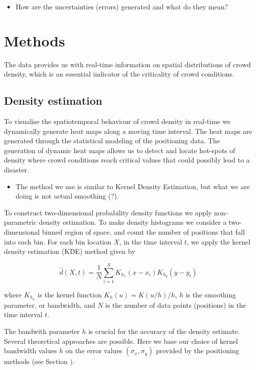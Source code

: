\documentclass[10pt,a4paper]{article}
\begin{document}
\begin{itemize}
\item How are the uncertainties (errors) generated and what do they mean?
\end{itemize}

\section{Methods}

The data provides us with real-time information on spatial distributions of crowd density, which is an essential indicator of the criticality of crowd conditions. 

\subsection{Density estimation}

To visualise the spatiotemporal behaviour of crowd density in real-time we dynamically generate heat maps along a moving time interval. The heat maps are generated through the statistical modeling of the positioning data. The generation of dynamic heat maps allows us to detect and locate hot-spots of density where crowd conditions reach critical values that could possibly lead to a disaster.

\begin{itemize}
\item The method we use is similar to Kernel Density Estimation, but what we are doing is not actual smoothing (?).
\end{itemize}

To construct two-dimensional probability density functions we apply non-parametric density estimation.
To make density histograms we consider a two-dimensional binned region of space, and count the number of positions that fall into each bin. For each bin location $X$, in the time interval $t$, we apply the kernel density estimation (KDE) method \cite{scott}\cite{silverman} given by

\begin{equation}
\hat{d}(X,t)=\frac{1}{N }\sum_{i=1}^{N} K_{h_{x}} (x-x_{i}) K_{h_{y}} (y-y_{i})
\label{kde}
\end{equation}

where $K_{h_{u}}$ is the kernel function $K_{h}(u)=K(u/h)/h$, $h$ is the smoothing parameter, or bandwidth, and $N$ is the number of data points (positions) in the time interval $t$.

The bandwith parameter $h$ is crucial for the accuracy of the density estimate. 
Several theoretical approaches are possible.
Here we base our choice of kernel bandwidth values $h$ on the error values $(\sigma_{x},\sigma_{y})$ provided by the positioning methods (see Section ).
\end{document}
